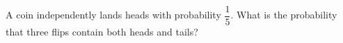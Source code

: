 A coin independently lands heads with probability $\dfrac{1}{5}$. What is the probability that three flips contain both heads and tails?
